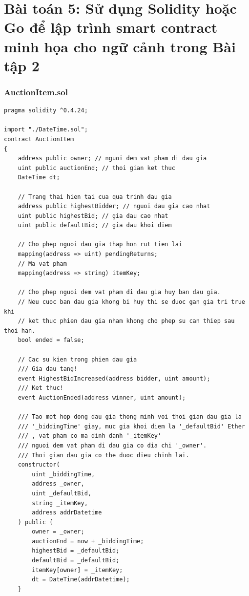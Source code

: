 \documentclass[a4paper]{article}
\begin{document}
\section{Bài toán 5: Sử dụng Solidity hoặc Go để lập trình smart contract minh họa cho ngữ cảnh trong
Bài tập 2}
\begin{frame}
\frametitle{AuctionItem.sol}
\begin{lstlisting}[basicstyle=\small]
pragma solidity ^0.4.24;

import "./DateTime.sol";
contract AuctionItem
{
    address public owner; // nguoi dem vat pham di dau gia
    uint public auctionEnd; // thoi gian ket thuc
    DateTime dt;

    // Trang thai hien tai cua qua trinh dau gia
    address public highestBidder; // nguoi dau gia cao nhat
    uint public highestBid; // gia dau cao nhat
    uint public defaultBid; // gia dau khoi diem

    // Cho phep nguoi dau gia thap hon rut tien lai
    mapping(address => uint) pendingReturns;
    // Ma vat pham
    mapping(address => string) itemKey;

    // Cho phep nguoi dem vat pham di dau gia huy ban dau gia.
    // Neu cuoc ban dau gia khong bi huy thi se duoc gan gia tri true khi
    // ket thuc phien dau gia nham khong cho phep su can thiep sau thoi han.
    bool ended = false;

    // Cac su kien trong phien dau gia
    /// Gia dau tang!
    event HighestBidIncreased(address bidder, uint amount);
    /// Ket thuc!
    event AuctionEnded(address winner, uint amount);

    /// Tao mot hop dong dau gia thong minh voi thoi gian dau gia la
    /// '_biddingTime' giay, muc gia khoi diem la '_defaultBid' Ether
    /// , vat pham co ma dinh danh '_itemKey'
    /// nguoi dem vat pham di dau gia co dia chi '_owner'.
    /// Thoi gian dau gia co the duoc dieu chinh lai.
    constructor(
        uint _biddingTime,
        address _owner,
        uint _defaultBid,
        string _itemKey,
        address addrDatetime
    ) public {
        owner = _owner;
        auctionEnd = now + _biddingTime;
        highestBid = _defaultBid;
        defaultBid = _defaultBid;
        itemKey[owner] = _itemKey;
        dt = DateTime(addrDatetime);
    }


\end{lstlisting}
\end{frame}
\end{document}
